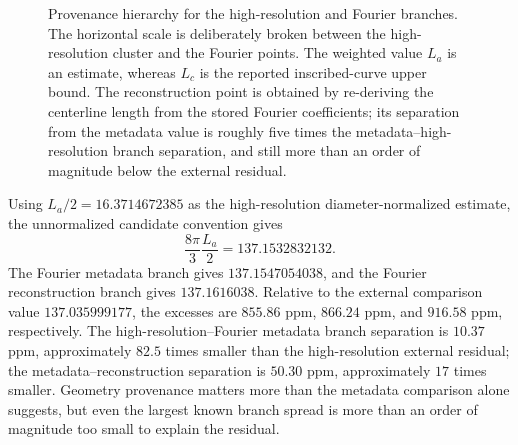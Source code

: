 \documentclass[aps,pre,preprint,notitlepage,nofootinbib,superscriptaddress]{revtex4-2}
\begin{document}
\begin{figure}[t]
{%
}
\caption{Provenance hierarchy for the high-resolution and Fourier branches.  The horizontal scale is deliberately broken between the high-resolution cluster and the Fourier points.  The weighted value $L_a$ is an estimate, whereas $L_c$ is the reported inscribed-curve upper bound.  The reconstruction point is obtained by re-deriving the centerline length from the stored Fourier coefficients; its separation from the metadata value is roughly five times the metadata--high-resolution branch separation, and still more than an order of magnitude below the external residual.}
\label{fig:provenance-v020}
\end{figure}


Using $L_a/2=16.3714672385$ as the high-resolution diameter-normalized estimate, the unnormalized candidate convention gives
\begin{equation}
  \frac{8\pi}{3}\frac{L_a}{2}=137.1532832132.
\end{equation}
The Fourier metadata branch gives $137.1547054038$, and the Fourier reconstruction branch gives $137.1616038$.  Relative to the external comparison value $137.035999177$, the excesses are $855.86$ ppm, $866.24$ ppm, and $916.58$ ppm, respectively.  The high-resolution--Fourier metadata branch separation is $10.37$ ppm, approximately $82.5$ times smaller than the high-resolution external residual; the metadata--reconstruction separation is $50.30$ ppm, approximately $17$ times smaller.  Geometry provenance matters more than the metadata comparison alone suggests, but even the largest known branch spread is more than an order of magnitude too small to explain the residual.
\end{document}
